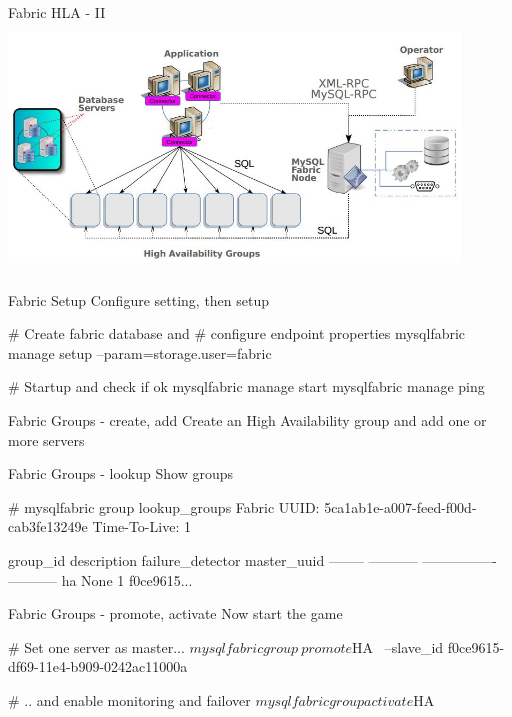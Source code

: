 \documentclass{beamer}[10]
\begin{document}
\begin{pyframe}{Fabric HLA - II}
\includegraphics[height=6.6cm,width=12cm]{images/mysql-fabric-hla.jpg}
\end{pyframe}


\begin{pyframe}{Fabric Setup}
Configure  setting, then setup
\begin{bashcode}
# Create fabric database and
# configure endpoint properties
mysqlfabric manage setup --param=storage.user=fabric

# Startup and check if ok
mysqlfabric manage start
mysqlfabric manage ping
\end{bashcode}
\end{pyframe}


\begin{pyframe}{Fabric Groups - create, add}
Create an High Availability group and add one or more servers
\end{pyframe}


\begin{pyframe}{Fabric Groups - lookup}
Show groups
\begin{bashcode}
# mysqlfabric group lookup_groups
Fabric UUID:  5ca1ab1e-a007-feed-f00d-cab3fe13249e
Time-To-Live: 1

group_id description failure_detector master_uuid
-------- ----------- ---------------- -----------
      ha        None                1 f0ce9615...

\end{bashcode}
\end{pyframe}

\begin{pyframe}{Fabric Groups - promote, activate}
Now start the game
\begin{bashcode}
# Set one server as master...
$ mysqlfabric group \
    promote $HA \
     --slave_id f0ce9615-df69-11e4-b909-0242ac11000a

# .. and enable monitoring and failover
$ mysqlfabric group activate $HA
\end{bashcode}
\end{pyframe}
\end{document}
